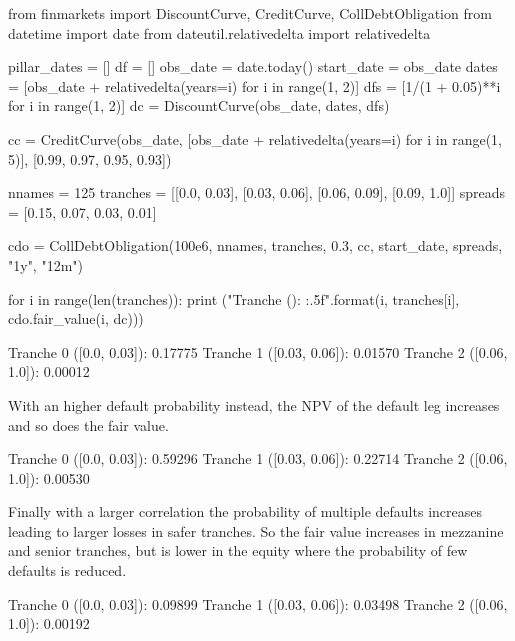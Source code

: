 \cprotEnv\begin{solution}

\begin{ipython}
from finmarkets import DiscountCurve, CreditCurve, CollDebtObligation
from datetime import date
from dateutil.relativedelta import relativedelta

pillar_dates = []
df = []
obs_date = date.today()
start_date = obs_date
dates = [obs_date + relativedelta(years=i) for i in range(1, 2)]
dfs = [1/(1 + 0.05)**i for i in range(1, 2)]
dc = DiscountCurve(obs_date, dates, dfs)

cc = CreditCurve(obs_date,
                 [obs_date + relativedelta(years=i) for i in range(1, 5)],
                 [0.99, 0.97, 0.95, 0.93])

nnames = 125
tranches = [[0.0, 0.03], [0.03, 0.06], [0.06, 0.09], [0.09, 1.0]]
spreads = [0.15, 0.07, 0.03, 0.01]

cdo = CollDebtObligation(100e6, nnames, tranches,
                         0.3, cc, start_date, spreads,
                         "1y", "12m")

for i in range(len(tranches)):
    print ("Tranche {} ({}): {:.5f}".format(i, tranches[i], cdo.fair_value(i, dc)))
\end{ipython}
\begin{ioutput}
Tranche 0 ([0.0, 0.03]): 0.17775
Tranche 1 ([0.03, 0.06]): 0.01570
Tranche 2 ([0.06, 1.0]): 0.00012
\end{ioutput}
With an higher default probability instead, the NPV of the default leg increases and so does the fair value.

\begin{ioutput}
Tranche 0 ([0.0, 0.03]): 0.59296
Tranche 1 ([0.03, 0.06]): 0.22714
Tranche 2 ([0.06, 1.0]): 0.00530
\end{ioutput}
Finally with a larger correlation the probability of multiple defaults increases leading to larger losses in safer tranches. So the fair value increases in mezzanine and senior tranches, but is lower in the equity where the probability of few defaults is reduced.

\begin{ioutput}
Tranche 0 ([0.0, 0.03]): 0.09899
Tranche 1 ([0.03, 0.06]): 0.03498
Tranche 2 ([0.06, 1.0]): 0.00192
\end{ioutput}
\end{solution}
